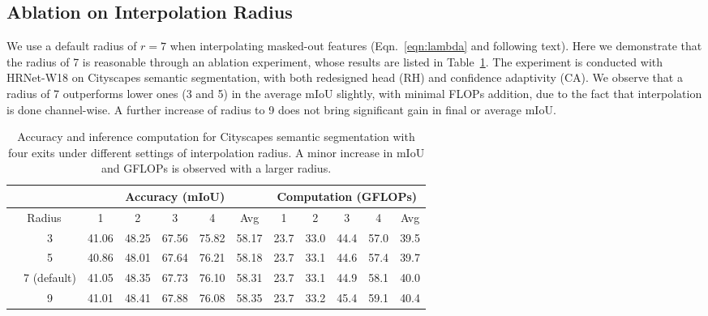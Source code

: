 \subsection{Ablation on Interpolation Radius}
We use a default radius of $r=7$ when interpolating masked-out features (Eqn.~\ref{eqn:lambda} and following text). Here we demonstrate that the radius of 7 is reasonable through an ablation experiment, whose results are listed in Table~\ref{tab:radius}. The experiment is conducted with HRNet-W18 on Cityscapes semantic segmentation, with both redesigned head (RH) and confidence adaptivity (CA). We observe that a radius of 7 outperforms lower ones (3 and 5) in the average mIoU slightly, with minimal FLOPs addition, due to the fact that interpolation is done channel-wise. A further increase of radius to 9 does not bring significant gain in final or average mIoU.
\begin{table}[!htbp]
\centering
\small
\begin{tabular}{cc|ccccc|ccccc}
\hline
\multicolumn{2}{c|}{}                            & \multicolumn{5}{c}{Accuracy (mIoU)}         & \multicolumn{5}{|c}{Computation (GFLOPs)}            \\ \hline
\multicolumn{2}{c|}{Radius}             & 1    & 2    & 3    & 4    & Avg  & 1     & 2     & 3     & 4      & Avg   \\ \hline
& 3 & 41.06 &   48.25 & 67.56 & 75.82  & 58.17  &  23.7 &  33.0 & 44.4 & 57.0 &   39.5  \\ 
& 5 & 40.86 &   48.01 & 67.64 & 76.21  & 58.18  &  23.7 & 33.1 & 44.6 & 57.4 &   39.7  \\ 
& 7 (default) & 41.05 & 48.35 & 67.73 & 76.10  & 58.31  & 23.7 & 33.1 & 44.9 & 58.1 &   40.0  \\ 
& 9 & 41.01 &   48.41 & 67.88 & 76.08 & 58.35  &  23.7 & 33.2 & 45.4 & 59.1 &   40.4  \\  \hline
\end{tabular}
\vspace{0ex}
\caption{%
Accuracy and inference computation for Cityscapes semantic segmentation with four exits under different settings of interpolation radius. A minor increase in mIoU and GFLOPs is observed with a larger radius.
}
\label{tab:radius}
\end{table}

